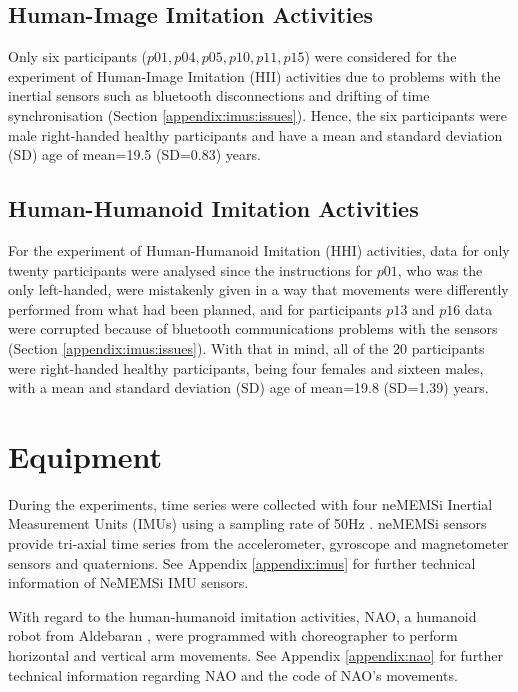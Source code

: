 \subsection{Human-Image Imitation Activities}
Only six participants ($p01, p04, p05, p10, p11, p15$) were considered 
for the experiment of Human-Image Imitation (HII) activities due to  
problems with the inertial sensors such as bluetooth disconnections and
drifting of time synchronisation (Section \ref{appendix:imus:issues}).
Hence, the six participants were male right-handed healthy participants 
and have a mean and standard deviation (SD) age of mean=19.5 (SD=0.83) years.


\subsection{Human-Humanoid Imitation Activities}
For the experiment of Human-Humanoid Imitation (HHI) activities, 
data for only twenty participants were analysed since the instructions 
for $p01$, who was the only left-handed, were mistakenly given in a way 
that movements were differently performed from what had been planned, 
and for participants $p13$ and $p16$ data were corrupted because of  
bluetooth communications problems with the sensors 
(Section \ref{appendix:imus:issues}).
With that in mind, all of the 20 participants were right-handed 
healthy participants, being four females and sixteen males, with 
a mean and standard deviation (SD) age of mean=19.8 (SD=1.39) years.





\section{Equipment}
During the experiments, time series were collected with four neMEMSi 
Inertial Measurement Units (IMUs) using a sampling rate of 50Hz 
\citep{Comotti2014}. neMEMSi sensors provide tri-axial time series from 
the accelerometer, gyroscope and magnetometer sensors and quaternions.
See Appendix \ref{appendix:imus} for further technical information of 
 NeMEMSi IMU sensors.

With regard to the human-humanoid imitation activities, NAO, 
a humanoid robot from Aldebaran \citep{gouaillier2009}, 
were programmed with choreographer to perform horizontal and vertical 
arm movements.
See Appendix \ref{appendix:nao} for further technical information 
regarding NAO and the code of NAO's
movements. 



